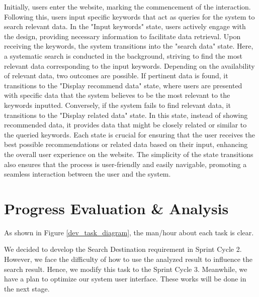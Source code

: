 \documentclass[conference]{IEEEtran}
\begin{document}
Initially, users enter the website, marking the commencement of the interaction. Following this, users input specific keywords that act as queries for the system to search relevant data. In the "Input keywords" state, users actively engage with the design, providing necessary information to facilitate data retrieval. Upon receiving the keywords, the system transitions into the "search data" state. Here, a systematic search is conducted in the background, striving to find the most relevant data corresponding to the input keywords. Depending on the availability of relevant data, two outcomes are possible. If pertinent data is found, it transitions to the "Display recommend data" state, where users are presented with specific data that the system believes to be the most relevant to the keywords inputted. Conversely, if the system fails to find relevant data, it transitions to the "Display related data" state. In this state, instead of showing recommended data, it provides data that might be closely related or similar to the queried keywords. Each state is crucial for ensuring that the user receives the best possible recommendations or related data based on their input, enhancing the overall user experience on the website. The simplicity of the state transitions also ensures that the process is user-friendly and easily navigable, promoting a seamless interaction between the user and the system.



\section{\textbf{Progress Evaluation \& Analysis }}

As shown in Figure \ref{dev_task_diagram}, the man/hour about each task is clear.

We decided to develop the Search Destination requirement in Sprint Cycle 2. However, we face the difficulty of how to use the analyzed result to influence the search result. Hence, we modify this task to the Sprint Cycle 3. Meanwhile, we have a plan to optimize our system user interface. These works will be done in the next stage.
\end{document}
